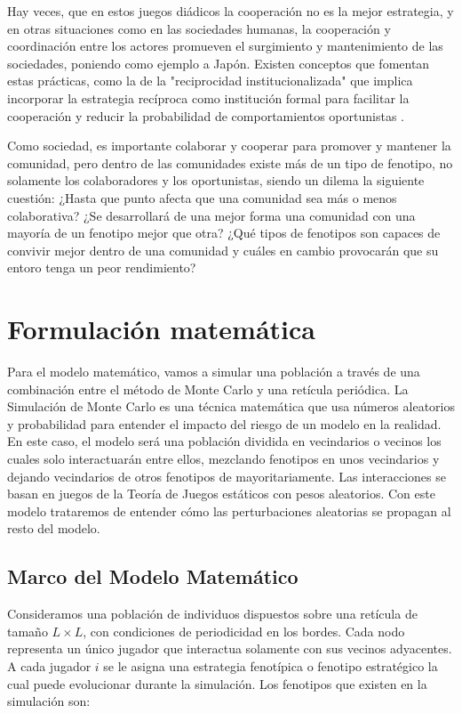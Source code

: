 \documentclass[a4paper,12pt]{report}
\begin{document}
Hay veces, que en estos juegos diádicos la cooperación no es la mejor estrategia, y en otras situaciones como en las sociedades humanas, la cooperación y coordinación entre los actores promueven el surgimiento y mantenimiento de las sociedades, poniendo como ejemplo a Japón. Existen conceptos que fomentan estas prácticas, como la de la "reciprocidad institucionalizada" que implica incorporar la estrategia recíproca como institución formal para facilitar la cooperación y reducir la probabilidad de comportamientos oportunistas \cite{Ozono2016Reciprocity}.

Como sociedad, es importante colaborar y cooperar para promover y mantener la comunidad, pero dentro de las comunidades existe más de un tipo de fenotipo, no solamente los colaboradores y los oportunistas, siendo un dilema la siguiente cuestión: ¿Hasta que punto afecta que una comunidad sea más o menos colaborativa? ¿Se desarrollará de una mejor forma una comunidad con una mayoría de un fenotipo mejor que otra? ¿Qué tipos de fenotipos son capaces de convivir mejor dentro de una comunidad y cuáles en cambio provocarán que su entoro tenga un peor rendimiento? 

\chapter{Formulación matemática}

Para el modelo matemático, vamos a simular una población a través de una combinación entre el método de Monte Carlo y una retícula periódica.
La Simulación de Monte Carlo es una técnica matemática que usa números aleatorios y probabilidad para entender el impacto del riesgo de un modelo en la realidad.
En este caso, el modelo será una población dividida en vecindarios o vecinos los cuales solo interactuarán entre ellos, mezclando fenotipos en unos vecindarios y dejando vecindarios de otros fenotipos de mayoritariamente.
Las interacciones se basan en juegos de la Teoría de Juegos estáticos con pesos aleatorios.
Con este modelo trataremos de entender cómo las perturbaciones aleatorias se propagan al resto del modelo.

\section{Marco del Modelo Matemático}

Consideramos una población de individuos dispuestos sobre una retícula de tamaño \( L \times L\), con condiciones de periodicidad en los bordes. Cada nodo representa un único jugador que interactua solamente con sus vecinos adyacentes.
A cada jugador \( i \) se le asigna una estrategia fenotípica o fenotipo estratégico la cual puede evolucionar durante la simulación. Los fenotipos que existen en la simulación son:
\end{document}
